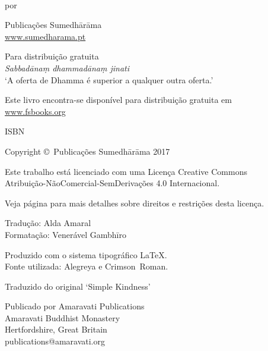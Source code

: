 \cleartoverso
\thispagestyle{empty}

{\copyrightsize
\centering
\setlength{\parindent}{0pt}%
\setlength{\parskip}{0.8\baselineskip}%

\thetitle\\
por \theauthor

Publicações Sumedhārāma\\
\href{http://sumedharama.pt}{www.sumedharama.pt}

Para distribuição gratuita\\
\textit{Sabbadānaṃ dhammadānaṃ jinati}\\
‘A oferta de Dhamma é superior a qualquer outra oferta.’

Este livro encontra-se disponível para distribuição gratuita em\\
\href{http://fsbooks.org/}{www.fsbooks.org}

ISBN \theISBN

Copyright \copyright\ Publicações Sumedhārāma 2017

Este trabalho está licenciado com uma Licença Creative Commons\\
Atribuição-NãoComercial-SemDerivações 4.0 Internacional.

Veja página \pageref{copyright-details} para mais detalhes sobre direitos e restrições desta licença.

\theEditionInfo

Tradução: Alda Amaral\\
Formatação: Venerável Gambhīro

Produzido com o sistema tipográfico \LaTeX.\\
Fonte utilizada: Alegreya e Crimson~Roman.

\vfill

Traduzido do original `Simple Kindness'

Publicado por Amaravati Publications\\
Amaravati Buddhist Monastery\\
Hertfordshire, Great Britain\\
publications@amaravati.org

}
